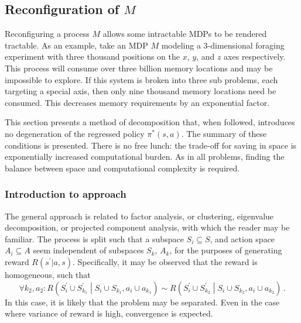  
\subsection{Reconfiguration of $M$}

Reconfiguring a process $M$ allows some intractable MDPs to be rendered tractable. 
As an example, take an MDP $M$ modeling a 3-dimensional foraging experiment with three thousand positions on the $x$, $y$, and $z$
axes respectively. This process will consume over three billion memory locations and may be impossible to explore. If this system is
broken into three sub problems, each targeting a special axis, then only nine thousand memory locations need be consumed. This decreases memory requirements by an exponential factor.

This section presents a method of decomposition that, when followed, introduces no degeneration of the regressed policy $\pi^{*}(s,a)$.
The summary of these conditions is presented. There is no free lunch: the trade-off for saving in space is exponentially increased computational burden. As in all problems, finding the balance between space and computational complexity is required.

 

\subsubsection{Introduction to approach}

The general approach is related to factor analysis, or clustering, eigenvalue decomposition, or projected component analysis, with which the reader may be familiar. The process is split such that a subspace $S_i \subseteq S$, and action space $A_i \subseteq A$ seem independent of subspaces $S_k$, $A_k$, for the purposes of generating reward $R(s^\prime|a,s)$. Specifically, it may be observed that the reward is homogeneous, such that 
\begin{equation*}
\forall k_2, a_2: R\left(S^\prime_i \cup  S^\prime_{k_1} \middle| S_i \cup S_{k_1} , a_i \cup a_{k_1} \right) \sim R\left( S^\prime_i \cup S^\prime_{k_2}  \middle|  S_i \cup S_{k_2} , a_i \cup a_{k_2}  \right)\,.
\end{equation*}
In this case, it is likely that the problem may be separated. Even in the case where variance of reward is high, convergence is expected.

